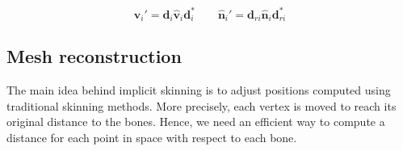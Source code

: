 \documentclass[a4paper,10pt]{article}
\begin{document}
\begin{multicols}{2}
\begin{equation*}
\hat{\mathbf{v}}_i' = \mathbf{d}_i \hat{\mathbf{v}}_i \mathbf{d}_i^*
\qquad
\hat{\mathbf{n}}_i' = \mathbf{d}_{ri} \hat{\mathbf{n}}_i \mathbf{d}_{ri}^*
\end{equation*}


\subsection{Mesh reconstruction}
\label{section:mesh_reconstruction}

The main idea behind implicit skinning is to adjust positions computed using traditional skinning methods.
More precisely, each vertex is moved to reach its original distance to the bones.
Hence, we need an efficient way to compute a distance for each point in space with respect to each bone.


\end{multicols}
\end{document}
